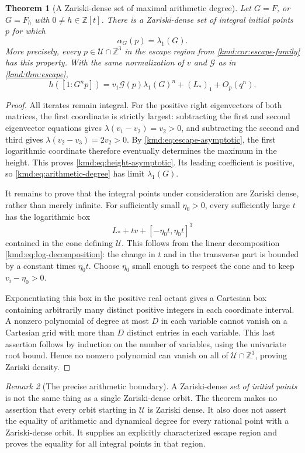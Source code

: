 \documentclass[11pt,a4paper]{article}
\numberwithin{equation}{section}
\newtheorem{theorem}{Theorem}[section]
\theoremstyle{definition}
\theoremstyle{remark}
\newtheorem{remark}[theorem]{Remark}
\newcommand{\Z}{\mathbb Z}
\newcommand{\calU}{\mathcal U}
\begin{document}
\begin{theorem}[A Zariski-dense set of maximal arithmetic degree]
\label{kmd:thm:arithmetic}
Let $G=F$, or $G=F_h$ with $0\ne h\in\Z[t]$. There is a
Zariski-dense set of integral initial points $p$ for which
\[
 \alpha_G(p)=\lambda_1(G).
\]
More precisely, every $p\in\calU\cap\Z^3$ in the escape region
from \cref{kmd:cor:escape-family} has this property. With the same
normalization of $v$ and $\mathcal G$ as in \cref{kmd:thm:escape},
\begin{equation}
 h([1:G^np])
 =v_1\mathcal G(p)\lambda_1(G)^n+(L_*)_1+O_p(q^n).
 \label{kmd:eq:height-asymptotic}
\end{equation}
\end{theorem}
\begin{proof}
All iterates remain integral. For the positive right eigenvectors
of both matrices, the first coordinate is strictly largest:
subtracting the first and second eigenvector equations gives
$\lambda(v_1-v_2)=v_2>0$, and subtracting the second and third
gives $\lambda(v_2-v_3)=2v_2>0$. By
\eqref{kmd:eq:escape-asymptotic}, the first logarithmic coordinate
therefore eventually determines the maximum in the height. This
proves \eqref{kmd:eq:height-asymptotic}. Its leading coefficient is
positive, so \eqref{kmd:eq:arithmetic-degree} has limit $\lambda_1(G)$.

It remains to prove that the integral points under consideration
are Zariski dense, rather than merely infinite. For sufficiently
small $\eta_0>0$, every sufficiently large $t$ has the logarithmic
box
\[
 L_*+tv+[-\eta_0t,\eta_0t]^3
\]
contained in the cone defining $\calU$. This follows from the
linear decomposition \eqref{kmd:eq:log-decomposition}: the change in
$t$ and in the transverse part is bounded by a constant times
$\eta_0t$. Choose $\eta_0$ small enough to respect the cone and
to keep $v_i-\eta_0>0$.

Exponentiating this box in the positive real octant gives a
Cartesian box containing arbitrarily many distinct positive
integers in each coordinate interval. A nonzero polynomial of
degree at most $D$ in each variable cannot vanish on a Cartesian
grid with more than $D$ distinct entries in each variable. This
last assertion follows by induction on the number of variables,
using the univariate root bound. Hence no nonzero polynomial can
vanish on all of $\calU\cap\Z^3$, proving Zariski density.
\end{proof}

\begin{remark}[The precise arithmetic boundary]\label{kmd:rem:arithmetic-boundary}
A Zariski-dense \emph{set of initial points} is not the same thing
as a single Zariski-dense orbit. The theorem makes no assertion
that every orbit starting in $\calU$ is Zariski dense. It also does
not assert the equality of arithmetic and dynamical degree for
every rational point with a Zariski-dense orbit. It supplies an
explicitly characterized escape region and proves the equality
for all integral points in that region.
\end{remark}
\end{document}
